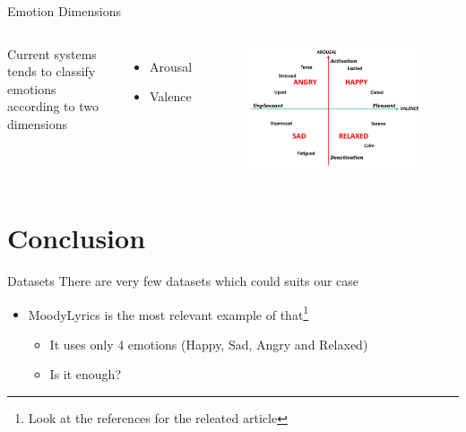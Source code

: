 \documentclass[xcolor=dvipsnames]{beamer}
\begin{document}
\begin{frame}{Emotion Dimensions}
\begin{columns}
Current systems tends to classify emotions according to two dimensions
\begin{itemize}
\item Arousal
\item Valence
\end{itemize}
\begin{figure}
	\centering
	\includegraphics[scale=0.3]{./images/emotion-dimensions}
\end{figure}
\end{columns}
\end{frame}


\section{Conclusion}

\begin{frame}{Datasets}
There are very few datasets which could suits our case
\begin{itemize}
\item MoodyLyrics is the most relevant example of that\footnote{Look at the references for the releated article}
\begin{itemize}
\item It uses only 4 emotions (Happy, Sad, Angry and Relaxed)
\item Is it enough?
\end{itemize}
\end{itemize}
\end{frame}
\end{document}
